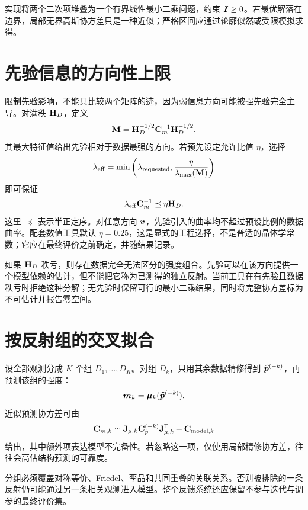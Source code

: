 实现将两个二次项堆叠为一个有界线性最小二乘问题，约束 $\bm{I}\ge0$。若最优解落在边界，局部无界高斯协方差只是一种近似；严格区间应通过轮廓似然或受限模拟求得。

\section{先验信息的方向性上限}
限制先验影响，不能只比较两个矩阵的迹，因为弱信息方向可能被强先验完全主导。对满秩 $\mathbf{H}_D$，定义
\begin{equation}
\mathbf{M}=\mathbf{H}_D^{-1/2}\mathbf{C}_m^{-1}\mathbf{H}_D^{-1/2}.
\end{equation}
其最大特征值给出先验相对于数据最强的方向。若预先设定允许比值 $\eta$，选择
\begin{equation}
\lambda_{\mathrm{eff}}=
\min\left(\lambda_{\mathrm{requested}},\frac{\eta}{\lambda_{\max}(\mathbf{M})}\right)
\end{equation}
即可保证
\begin{equation}
\lambda_{\mathrm{eff}}\mathbf{C}_m^{-1}\preceq\eta\mathbf{H}_D.
\label{eq:info_cap}
\end{equation}
这里 $\preceq$ 表示半正定序。对任意方向 $\bm{v}$，先验引入的曲率均不超过预设比例的数据曲率。配套数值工具默认 $\eta=0.25$，这是显式的工程选择，不是普适的晶体学常数；它应在最终评价之前确定，并随结果记录。

如果 $\mathbf{H}_D$ 秩亏，则存在数据完全无法区分的强度组合。先验可以在该方向提供一个模型依赖的估计，但不能把它称为已测得的独立反射。当前工具在有先验且数据秩亏时拒绝这种分解；无先验时保留可行的最小二乘结果，同时将完整协方差标为不可估计并报告零空间。

\section{按反射组的交叉拟合}
设全部观测分成 $K$ 个组 $D_1,\ldots,D_K$。对组 $D_k$，只用其余数据精修得到 $\widehat{\bm{p}}^{(-k)}$，再预测该组的强度：
\begin{equation}
\bm{m}_k=\bm{\mu}_k(\widehat{\bm{p}}^{(-k)}).
\end{equation}
近似预测协方差可由
\begin{equation}
\mathbf{C}_{m,k}\simeq
\mathbf{J}_{\mu,k}\mathbf{C}_p^{(-k)}\mathbf{J}_{\mu,k}^{\mathsf T}
+\mathbf{C}_{\mathrm{model},k}
\end{equation}
给出，其中额外项表达模型不完备性。若忽略这一项，仅使用局部精修协方差，往往会高估结构预测的可靠度。

分组必须覆盖对称等价、Friedel、孪晶和共同重叠的关联关系。否则被排除的一条反射仍可能通过另一条相关观测进入模型。整个反馈系统还应保留不参与迭代与调参的最终评价集。

